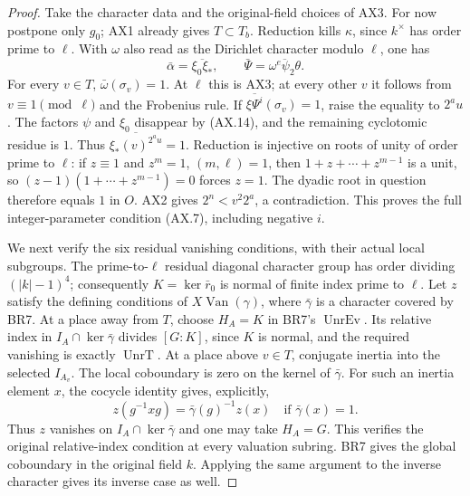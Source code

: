 \begin{proof}
Take the character data and the original-field choices of AX3.
For now postpone only $g_0$; AX1 already gives $T\subset T_b$.
Reduction kills $\kappa$, since $k^\times$ has order prime to
$\ell$.  With $\omega$ also read as the Dirichlet character
modulo $\ell$, one has
\[
 \bar\alpha=\overline{\xi_0\xi_*},\qquad
 \bar\Psi=\overline{\omega^e\psi_2\theta}.
 \tag{AX.16}
\]
For every $v\in T$, $\bar\omega(\sigma_v)=1$.
At $\ell$ this is AX3; at every other $v$ it follows from
$v\equiv1\pmod\ell$ and the Frobenius rule.
If $\overline{\xi\Psi^i}(\sigma_v)=1$, raise the equality to
$2^a u$.  The factors $\psi$ and $\xi_0$ disappear by (AX.14),
and the remaining cyclotomic residue is $1$.  Thus
$\overline{\xi_*(v)^{2^a u}}=1$.
Reduction is injective on roots of unity of order prime to $\ell$:
if $z\equiv1$ and $z^m=1$, $(m,\ell)=1$, then
$1+z+\cdots+z^{m-1}$ is a unit, so
$(z-1)(1+\cdots+z^{m-1})=0$ forces $z=1$.
The dyadic root in question therefore equals $1$ in $O$.
AX2 gives $2^n<v^2 2^a$, a contradiction.  This proves the full
integer-parameter condition (AX.7), including negative $i$.

We next verify the six residual vanishing conditions, with their
actual local subgroups.  The prime-to-$\ell$ residual diagonal
character group has order dividing $(|k|-1)^4$; consequently
$K=\ker\bar r_0$ is normal of finite index prime to $\ell$.
Let $z$ satisfy the defining conditions of $X\!\operatorname{Van}
(\gamma)$, where $\bar\gamma$ is a character covered by BR7.
At a place away from $T$, choose $H_A=K$ in BR7's
$\operatorname{UnrEv}$.  Its relative index in
$I_A\cap\ker\bar\gamma$ divides $[G:K]$, since $K$ is normal,
and the required vanishing is exactly $\operatorname{UnrT}$.
At a place above $v\in T$, conjugate inertia into the selected
$I_{A_v}$.  The local coboundary is zero on the kernel of
$\bar\gamma$.  For such an inertia element $x$, the cocycle
identity gives, explicitly,
\[
 z(g^{-1}xg)=\bar\gamma(g)^{-1}z(x)
       \quad\text{if }\bar\gamma(x)=1.
 \tag{AX.17}
\]
Thus $z$ vanishes on $I_A\cap\ker\bar\gamma$ and one may take
$H_A=G$.  This verifies the original relative-index condition at
every valuation subring.  BR7 gives the global coboundary in the
original field $k$.  Applying the same argument to the inverse
character gives its inverse case as well.


\end{proof}
